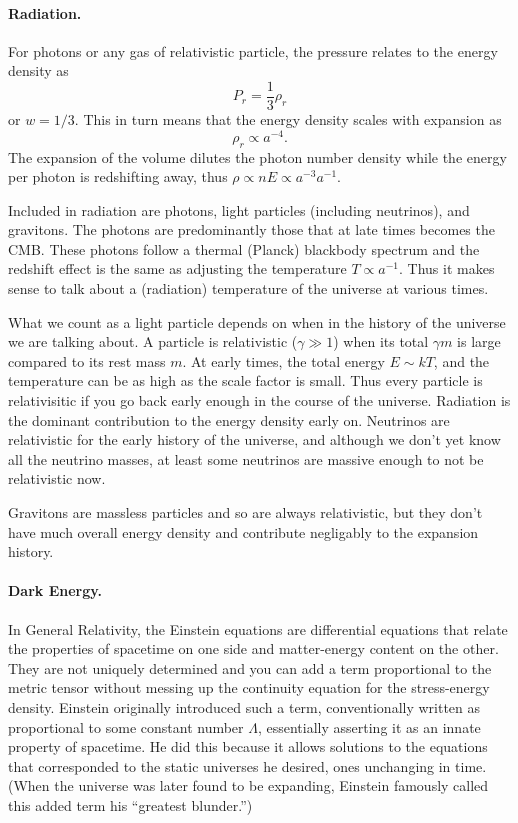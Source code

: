 \paragraph{Radiation.}  For photons or any gas of relativistic particle, the pressure relates to the energy density as
\begin{equation}
  P_r = \frac{1}{3} \rho_r
\end{equation}
or $w=1/3$.
This in turn means that the energy density scales with expansion as
\begin{equation}
  \rho_r \propto a^{-4}.
\end{equation}
The expansion of the volume dilutes the photon number density while the energy per photon is redshifting away, thus $\rho \propto n E \propto a^{-3}a^{-1}$.

Included in radiation are photons, light particles (including neutrinos), and gravitons.  The  photons are predominantly those that at late times becomes the CMB.  These photons follow a thermal (Planck) blackbody spectrum and the redshift effect is the same as adjusting the temperature $T \propto a^{-1}$.  Thus it makes sense to talk about a (radiation) temperature of the universe at various times.

What we count as a light particle depends on when in the history of the universe we are talking about.  A particle is relativistic ($\gamma \gg 1$) when its total $\gamma m$ is large compared to its rest mass $m$.  At early times, the total energy $E \sim kT$, and the temperature can be as high as the scale factor is small.  Thus every particle is relativisitic if you go back early enough in the course of the universe.  Radiation is the dominant contribution to the energy density early on.  Neutrinos are relativistic for the early history of the universe, and although we don't yet know all the neutrino masses, at least some neutrinos are massive enough to not be relativistic now.

Gravitons are massless particles and so are always relativistic, but they don't have much overall energy density and contribute negligably to the expansion history.

\paragraph{Dark Energy.}  In General Relativity, the Einstein equations are differential equations that relate the properties of spacetime on one side and matter-energy content on the other.  They are not uniquely determined and you can add a term proportional to the metric tensor without messing up the continuity equation for the stress-energy density.  Einstein originally introduced such a term, conventionally written as proportional to some constant number $\Lambda$, essentially asserting it as an innate property of spacetime.  He did this because it allows solutions to the equations that corresponded to the static universes he desired, ones unchanging in time.  (When the universe was later found to be expanding, Einstein famously called this added term his ``greatest blunder.'')

